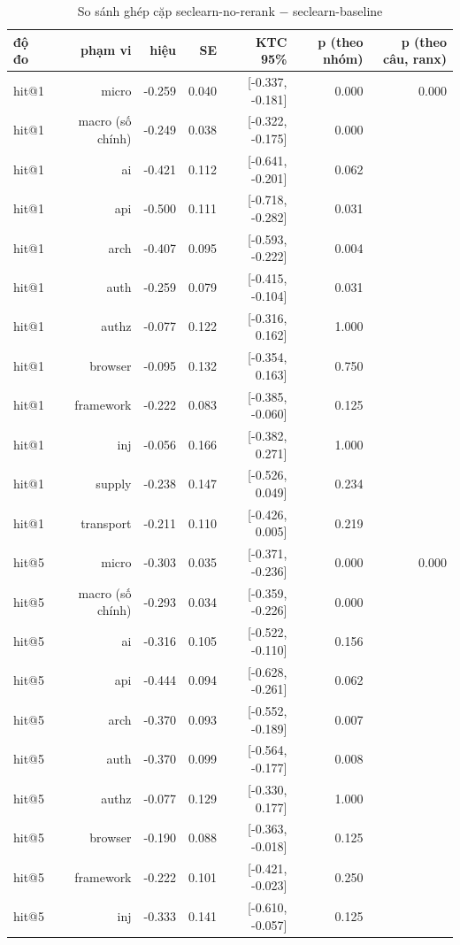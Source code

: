 \begin{table}[ht]
\centering
\caption{So sánh ghép cặp seclearn-no-rerank $-$ seclearn-baseline}
\begin{tabular}{lrrrrrr}
\toprule
độ đo & phạm vi & hiệu & SE & KTC 95\% & p (theo nhóm) & p (theo câu, ranx) \\
\midrule
hit@1 & micro & -0.259 & 0.040 & [-0.337, -0.181] & 0.000 & 0.000 \\
hit@1 & macro (số chính) & -0.249 & 0.038 & [-0.322, -0.175] & 0.000 &  \\
hit@1 & ai & -0.421 & 0.112 & [-0.641, -0.201] & 0.062 &  \\
hit@1 & api & -0.500 & 0.111 & [-0.718, -0.282] & 0.031 &  \\
hit@1 & arch & -0.407 & 0.095 & [-0.593, -0.222] & 0.004 &  \\
hit@1 & auth & -0.259 & 0.079 & [-0.415, -0.104] & 0.031 &  \\
hit@1 & authz & -0.077 & 0.122 & [-0.316, 0.162] & 1.000 &  \\
hit@1 & browser & -0.095 & 0.132 & [-0.354, 0.163] & 0.750 &  \\
hit@1 & framework & -0.222 & 0.083 & [-0.385, -0.060] & 0.125 &  \\
hit@1 & inj & -0.056 & 0.166 & [-0.382, 0.271] & 1.000 &  \\
hit@1 & supply & -0.238 & 0.147 & [-0.526, 0.049] & 0.234 &  \\
hit@1 & transport & -0.211 & 0.110 & [-0.426, 0.005] & 0.219 &  \\
hit@5 & micro & -0.303 & 0.035 & [-0.371, -0.236] & 0.000 & 0.000 \\
hit@5 & macro (số chính) & -0.293 & 0.034 & [-0.359, -0.226] & 0.000 &  \\
hit@5 & ai & -0.316 & 0.105 & [-0.522, -0.110] & 0.156 &  \\
hit@5 & api & -0.444 & 0.094 & [-0.628, -0.261] & 0.062 &  \\
hit@5 & arch & -0.370 & 0.093 & [-0.552, -0.189] & 0.007 &  \\
hit@5 & auth & -0.370 & 0.099 & [-0.564, -0.177] & 0.008 &  \\
hit@5 & authz & -0.077 & 0.129 & [-0.330, 0.177] & 1.000 &  \\
hit@5 & browser & -0.190 & 0.088 & [-0.363, -0.018] & 0.125 &  \\
hit@5 & framework & -0.222 & 0.101 & [-0.421, -0.023] & 0.250 &  \\
hit@5 & inj & -0.333 & 0.141 & [-0.610, -0.057] & 0.125 &  \\

\end{tabular}
\end{table}
